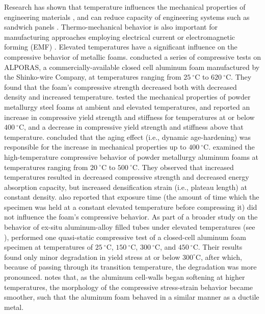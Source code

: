 \documentclass[review]{elsarticle}
\begin{document}
Research has shown that temperature influences the mechanical properties of engineering materials \cite{richeton_influence_2006}, and can reduce capacity of engineering systems such as sandwich panels \cite{zhang_mode_2020}. Thermo-mechanical behavior is also important for manufacturing approaches employing electrical current or electromagnetic forming (EMF) \cite{thomas_theory_2007}. Elevated temperatures have a significant influence on the compressive behavior of metallic foams. \cite{Aly2007} conducted a series of compressive tests on ALPORAS, a commercially-available closed cell aluminum foam manufactured by the Shinko-wire Company, at temperatures ranging from $25~^{\circ}\mathrm{C}$ to $620~^{\circ}\mathrm{C}$. They found that the foam's compressive strength decreased both with decreased density and increased temperature. \cite{BekozOktay2014} tested the mechanical properties of powder metallurgy steel foams at ambient and elevated temperatures, and reported an increase in compressive yield strength and stiffness for temperatures at or below $400~^{\circ}\mathrm{C}$, and a decrease in compressive yield strength and stiffness above that temperature. \cite{BekozOktay2014} concluded that the aging effect (i.e., dynamic age-hardening) was responsible for the increase in mechanical properties up to $400~^{\circ}\mathrm{C}$. \cite{Kovacicetal2016} examined the high-temperature compressive behavior of powder metallurgy aluminum foams at temperatures ranging from $20~^{\circ}\mathrm{C}$ to $500~^{\circ}\mathrm{C}$. They observed that increased temperatures resulted in decreased compressive strength and decreased energy absorption capacity, but increased densification strain (i.e., plateau length) at constant density. \cite{Kovacicetal2016} also reported that exposure time (the amount of time which the specimen was held at a constant elevated temperature before compressing it) did not influence the foam's compressive behavior. As part of a broader study on the behavior of ex-situ aluminum-alloy filled tubes under elevated temperatures (see \cite{Movahedi:2017}), \cite{Linul:2017} performed one quasi-static compressive test of a closed-cell aluminum foam specimen at temperatures of $25~^{\circ}\mathrm{C}$, $150~^{\circ}\mathrm{C}$, $300~^{\circ}\mathrm{C}$, and $450~^{\circ}\mathrm{C}$. Their results found only minor degradation in yield stress at or below $300^{\circ}\mathrm{C}$, after which, because of passing through its transition temperature, the degradation was more pronounced. \cite{Linul:2017} notes that, as the aluminum cell-walls began softening at higher temperatures, the morphology of the compressive stress-strain behavior became smoother, such that the aluminum foam behaved in a similar manner as a ductile metal.
\end{document}
